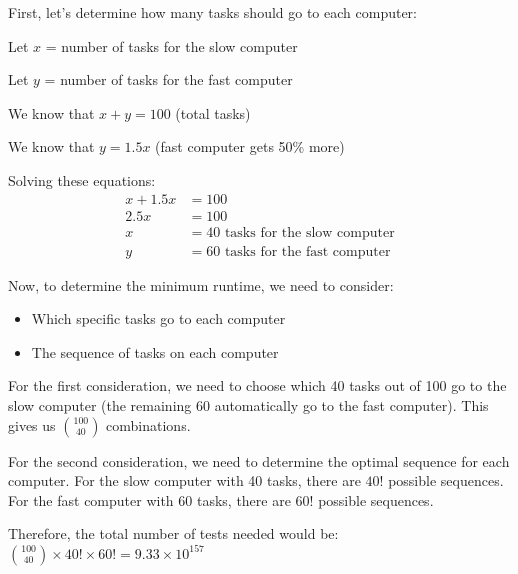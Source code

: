 \documentclass{article}
\begin{document}
First, let's determine how many tasks should go to each computer:

Let $x$ = number of tasks for the slow computer

Let $y$ = number of tasks for the fast computer

We know that $x + y = 100$ (total tasks)

We know that $y = 1.5x$ (fast computer gets 50\% more)

Solving these equations:
\begin{align}
x + 1.5x &= 100\\
2.5x &= 100\\
x &= 40 \text{ tasks for the slow computer}\\
y &= 60 \text{ tasks for the fast computer}
\end{align}

Now, to determine the minimum runtime, we need to consider:
\begin{itemize}
    \item Which specific tasks go to each computer
    \item The sequence of tasks on each computer
\end{itemize}

For the first consideration, we need to choose which 40 tasks out of 100 go to the slow computer (the remaining 60 automatically go to the fast computer). This gives us $\binom{100}{40}$ combinations.

For the second consideration, we need to determine the optimal sequence for each computer. For the slow computer with 40 tasks, there are $40!$ possible sequences. For the fast computer with 60 tasks, there are $60!$ possible sequences.

Therefore, the total number of tests needed would be:
$\binom{100}{40} \times 40! \times 60! = 9.33 \times 10^{157}$
\end{document}
